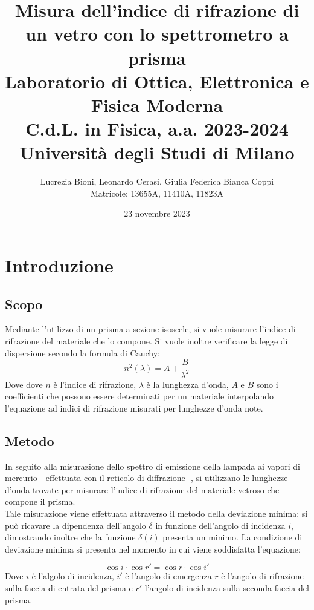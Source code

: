 \documentclass[]{article}
\title{%
    \Huge Misura dell'indice di rifrazione di un vetro con lo spettrometro a prisma \\
    \Large Laboratorio di Ottica, Elettronica e Fisica Moderna \\ C.d.L. in Fisica, a.a. 2023-2024 \\ Università degli Studi di Milano}
\author{\LARGE Lucrezia Bioni, Leonardo Cerasi, Giulia Federica Bianca Coppi \\ Matricole: 13655A, 11410A, 11823A}
\date{23 novembre 2023}
\let\oldsection\section%
\renewcommand{\section}{%
	\renewcommand{\theequation}{\thesection.\arabic{equation}}%
	\oldsection}%
\let\oldsubsection\subsection%
\renewcommand{\subsection}{%
	\renewcommand{\theequation}{\thesubsection.\arabic{equation}}%
	\oldsubsection}%
\begin{document}
    \maketitle

    \section{Introduzione}

    \subsection{Scopo}

    Mediante l'utilizzo di un prisma a sezione isoscele, si vuole misurare l'indice di rifrazione del materiale che lo compone. Si vuole inoltre verificare la legge di dispersione secondo la formula di Cauchy:
    \begin{equation}
        \label{cauchy}
        n^2(\lambda) = A + \frac{B}{\lambda^2}
    \end{equation}
    Dove dove $n$ è l'indice di rifrazione, $\lambda$ è la lunghezza d'onda, $A$ e $B$ sono i coefficienti che possono essere determinati per un materiale interpolando l'equazione ad indici di rifrazione misurati per lunghezze d'onda note.

    \subsection{Metodo}

    In seguito alla misurazione dello spettro di emissione della lampada ai vapori di mercurio - effettuata con il reticolo di diffrazione -, si utilizzano le lunghezze d'onda trovate per misurare l'indice di rifrazione del materiale vetroso che compone il prisma. \\
    Tale misurazione viene effettuata attraverso il metodo della deviazione minima: si può ricavare la dipendenza dell'angolo $\delta$ in funzione dell'angolo di incidenza $i$, dimostrando inoltre che la funzione $\delta (i)$ presenta un minimo. La condizione di deviazione minima si presenta nel momento in cui viene soddisfatta l'equazione:

    \begin{equation}
        \label{dev_minima}
        \cos i \cdot \cos r' = \cos r \cdot \cos i'
    \end{equation}
    Dove $i$ è l'algolo di incidenza, $i'$ è l'angolo di emergenza $r$ è l'angolo di rifrazione sulla faccia di entrata del prisma e $r'$ l'angolo di incidenza sulla seconda faccia del prisma.
\end{document}

